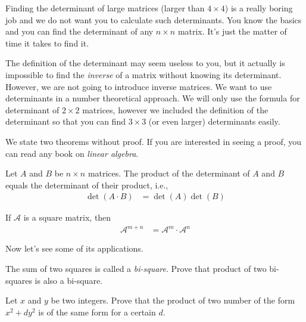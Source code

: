 Finding the determinant of large matrices (larger than $4 \times 4$) is a really boring job and we do not want you to calculate such determinants. You know the basics and you can find the determinant of any $n\times n$ matrix. It's just the matter of time it takes to find it.

The definition of the determinant may seem useless to you, but it actually is impossible to find the \textit{inverse} of a matrix without knowing its determinant. However, we are not going to introduce inverse matrices. We want to use determinants in a number theoretical approach. We will only use the formula for determinant of $2 \times 2$ matrices, however we included the definition of the determinant so that you can find $3 \times 3$ (or even larger) determinants easily.

We state two theorems without proof. If you are interested in seeing a proof, you can read any book on \textit{linear algebra}.

	\begin{theorem}
	Let $A$ and $B$ be $n\times n$ matrices. The product of the determinant of $A$ and $B$ equals the determinant of their product, i.e.,
		\begin{align*}
			\det(A \cdot B)
				& =\det(A)\det(B)
		\end{align*}
	\end{theorem}


\begin{theorem}
If $\mathcal A$ is a square matrix, then
	\begin{align*}
		\mathcal A^{m+n}
			& =\mathcal A^m \cdot \mathcal{A}^n
	\end{align*}
\end{theorem}

Now let's see some of its applications.

\begin{problem}
The sum of two squares is called a \textit{bi-square}. Prove that product of two bi-squares is also a bi-square.
\end{problem}

\begin{problem}
Let $x$ and $y$ be two integers. Prove that the product of two number of the form $x^2+dy^2$ is of the same form for a  certain $d$.
\end{problem}

